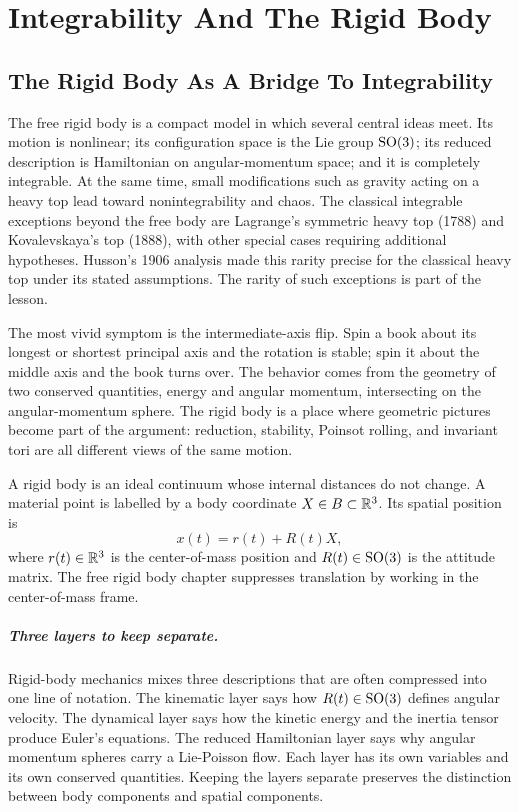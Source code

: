 \chapter{Integrability And The Rigid Body}
\label{chap:rigid-integrability}

\section{The Rigid Body As A Bridge To Integrability}
\label{sec:rigid-why-central}

The free rigid body is a compact model in which several central ideas meet. Its
motion is nonlinear; its configuration space is the Lie group \(\operatorname{SO}(3)\); its
reduced description is Hamiltonian on angular-momentum space; and it is
completely integrable. At the same time, small modifications such as gravity
acting on a heavy top lead toward nonintegrability and chaos. The classical
integrable exceptions beyond the free body are Lagrange's symmetric heavy top
(1788) and Kovalevskaya's top (1888), with other special cases requiring
additional hypotheses. Husson's 1906 analysis made this rarity precise for the
classical heavy top under its stated assumptions. The rarity of such exceptions
is part of the lesson.

The most vivid symptom is the intermediate-axis flip. Spin a book about its
longest or shortest principal axis and the rotation is stable; spin it about
the middle axis and the book turns over. The behavior comes from the geometry
of two conserved quantities, energy and angular momentum, intersecting on the
angular-momentum sphere. The rigid body is a place
where geometric pictures become part of the argument: reduction, stability,
Poinsot rolling, and invariant tori are all different views of the same motion.

\begin{assumption}
A rigid body is an ideal continuum whose internal distances do not change. A
material point is labelled by a body coordinate \(X\in B\subset\mathbb{R}^3\). Its
spatial position is
\[
  x(t)=r(t)+R(t)X,
\]
where \(r(t)\in\mathbb{R}^3\) is the center-of-mass position and
\(R(t)\in\operatorname{SO}(3)\) is the attitude matrix. The free rigid body chapter suppresses
translation by working in the center-of-mass frame.
\end{assumption}

\paragraph{Three layers to keep separate.}
Rigid-body mechanics mixes three descriptions that are often compressed into
one line of notation. The kinematic layer says how \(R(t)\in\operatorname{SO}(3)\) defines
angular velocity. The dynamical layer says how the kinetic energy and the
inertia tensor produce Euler's equations. The reduced Hamiltonian layer says
why angular momentum spheres carry a Lie-Poisson flow. Each layer has its own
variables and its own conserved quantities. Keeping the layers separate
preserves the distinction between body components and spatial components.

